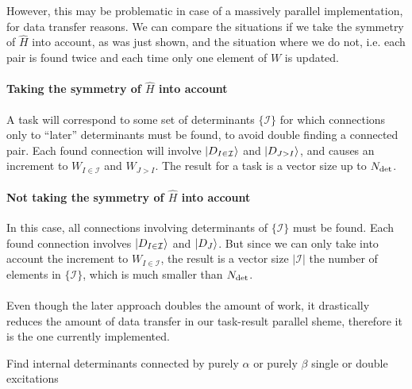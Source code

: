 \documentclass[./thesis.tex]{subfiles}
\begin{document}
However, this may be problematic in case of a massively parallel implementation, for data transfer reasons. We can compare the situations if we take the symmetry of $\widehat H$ into account, as was just shown, and the situation where we do not, i.e. each pair is found twice and each time only one element of $W$ is updated.

\paragraph{Taking the symmetry of $\widehat H$ into account}
A task will correspond to some set of determinants $\{\mathcal{I}\}$ for which connections only to ``later'' determinants must be found, to avoid double finding a connected pair. Each found connection will involve $\ket {D_{I \in \mathcal{I}}}$ and $\ket {D_{J>I}}$, and causes an increment to $W_{I \in \mathcal{I}}$ and $W_{J>I}$. The result for a task is a vector size up to ${N_\text{det}}$.

\paragraph{Not taking the symmetry of $\widehat H$ into account}
In this case, all connections involving determinants of $\{\mathcal{I}\}$ must be found. Each found connection involves $\ket {D_{I \in \mathcal{I}}}$ and $\ket {D_{J}}$. But since we can only take into account the increment to $W_{I \in \mathcal{I}}$, the result is a vector size $|\mathcal{I}|$ the number of elements in $\{\mathcal{I}\}$, which is much smaller than ${N_\text{det}}$.

\paragraph{}
Even though the later approach doubles the amount of work, it drastically reduces the amount of data transfer in our task-result parallel sheme, therefore it is the one currently implemented.


\begin{algorithm}
\caption{Find internal determinants connected by purely $\alpha$ or purely $\beta$ single or double excitations}
\label{alg:davidson_aa}

\end{algorithm}
\end{document}
